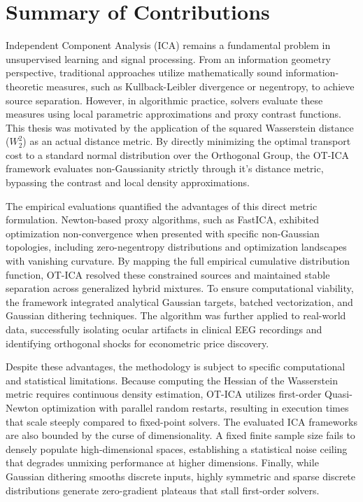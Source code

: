 \documentclass[12pt,a4paper,twoside,openany]{book}
\begin{document}
\section{Summary of Contributions}
Independent Component Analysis (ICA) remains a fundamental problem in unsupervised learning and signal processing. 
From an information geometry perspective, traditional approaches utilize mathematically sound information-theoretic measures, 
such as Kullback-Leibler divergence or negentropy, to achieve source separation. However, in algorithmic practice, 
solvers evaluate these measures using local parametric approximations and proxy contrast functions. 
This thesis was motivated by the application of the squared Wasserstein distance ($W_2^2$) as an actual distance metric. 
By directly minimizing the optimal transport cost to a standard normal distribution over the Orthogonal Group, 
the OT-ICA framework evaluates non-Gaussianity strictly through it's distance metric, bypassing the contrast and local density approximations.

The empirical evaluations quantified the advantages of this direct metric formulation. Newton-based proxy algorithms, 
such as FastICA, exhibited optimization non-convergence when presented with specific non-Gaussian topologies, 
including zero-negentropy distributions and optimization landscapes with vanishing curvature. 
By mapping the full empirical cumulative distribution function, OT-ICA resolved these constrained sources 
and maintained stable separation across generalized hybrid mixtures. To ensure computational viability, 
the framework integrated analytical Gaussian targets, batched vectorization, and Gaussian dithering techniques. 
The algorithm was further applied to real-world data, successfully isolating ocular artifacts in clinical 
EEG recordings and identifying orthogonal shocks for econometric price discovery.

Despite these advantages, the methodology is subject to specific computational and statistical limitations. 
Because computing the Hessian of the Wasserstein metric requires continuous density estimation, 
OT-ICA utilizes first-order Quasi-Newton optimization with parallel random restarts, resulting in execution times 
that scale steeply compared to fixed-point solvers. The evaluated ICA frameworks are also bounded by the curse of dimensionality. 
A fixed finite sample size fails to densely populate high-dimensional spaces, establishing a statistical noise ceiling 
that degrades unmixing performance at higher dimensions. Finally, while Gaussian dithering smooths discrete inputs, 
highly symmetric and sparse discrete distributions generate zero-gradient plateaus that stall first-order solvers.
\end{document}
